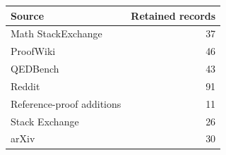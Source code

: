\begin{tabular}{lr}
\toprule
Source & Retained records \\
\midrule
Math StackExchange & 37 \\
ProofWiki & 46 \\
QEDBench~\citep{gonzalez2026qedbench} & 43 \\
Reddit & 91 \\
Reference-proof additions & 11 \\
Stack Exchange & 26 \\
arXiv & 30 \\
\bottomrule
\end{tabular}

